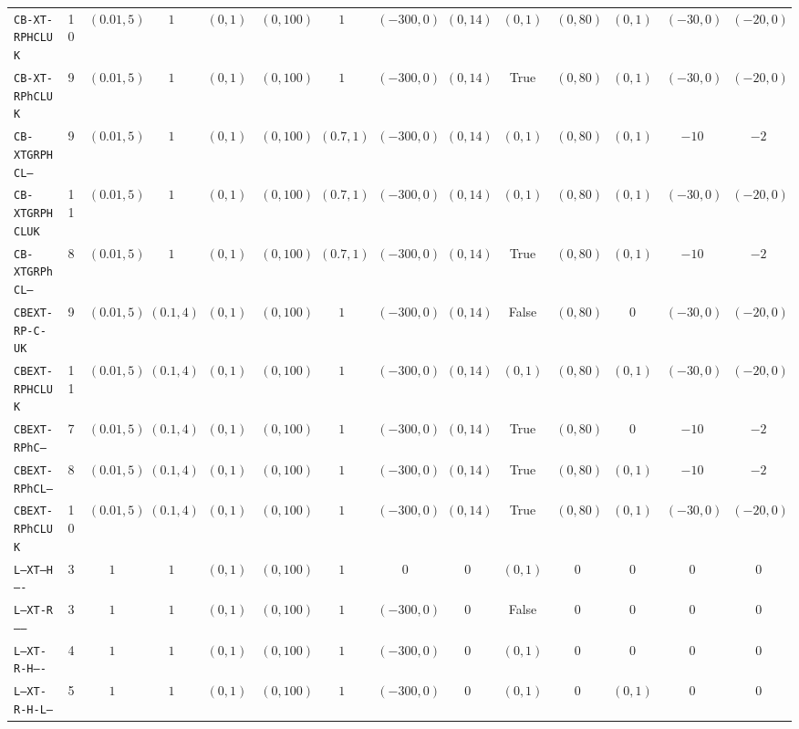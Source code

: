 {\begin{tabular}{l c c c c c c c c c c c c c }
\texttt{CB-XT-RPHCLUK} & 10 & $(0.01, 5)$ & $1$ & $(0, 1)$ & $(0, 100)$ & $1$ & $(-300, 0)$ & $(0, 14)$ & $(0, 1)$ & $(0, 80)$ & $(0, 1)$ & $(-30, 0)$ & $(-20, 0)$ \\
\texttt{CB-XT-RPhCLUK} & 9 & $(0.01, 5)$ & $1$ & $(0, 1)$ & $(0, 100)$ & $1$ & $(-300, 0)$ & $(0, 14)$ & \textrm{True} & $(0, 80)$ & $(0, 1)$ & $(-30, 0)$ & $(-20, 0)$ \\
\texttt{CB-XTGRPHCL--} & 9 & $(0.01, 5)$ & $1$ & $(0, 1)$ & $(0, 100)$ & $(0.7, 1)$ & $(-300, 0)$ & $(0, 14)$ & $(0, 1)$ & $(0, 80)$ & $(0, 1)$ & $-10$ & $-2$ \\
\texttt{CB-XTGRPHCLUK} & 11 & $(0.01, 5)$ & $1$ & $(0, 1)$ & $(0, 100)$ & $(0.7, 1)$ & $(-300, 0)$ & $(0, 14)$ & $(0, 1)$ & $(0, 80)$ & $(0, 1)$ & $(-30, 0)$ & $(-20, 0)$ \\
\texttt{CB-XTGRPhCL--} & 8 & $(0.01, 5)$ & $1$ & $(0, 1)$ & $(0, 100)$ & $(0.7, 1)$ & $(-300, 0)$ & $(0, 14)$ & \textrm{True} & $(0, 80)$ & $(0, 1)$ & $-10$ & $-2$ \\
\texttt{CBEXT-RP-C-UK} & 9 & $(0.01, 5)$ & $(0.1, 4)$ & $(0, 1)$ & $(0, 100)$ & $1$ & $(-300, 0)$ & $(0, 14)$ & \textrm{False} & $(0, 80)$ & $0$ & $(-30, 0)$ & $(-20, 0)$ \\
\texttt{CBEXT-RPHCLUK} & 11 & $(0.01, 5)$ & $(0.1, 4)$ & $(0, 1)$ & $(0, 100)$ & $1$ & $(-300, 0)$ & $(0, 14)$ & $(0, 1)$ & $(0, 80)$ & $(0, 1)$ & $(-30, 0)$ & $(-20, 0)$ \\
\texttt{CBEXT-RPhC---} & 7 & $(0.01, 5)$ & $(0.1, 4)$ & $(0, 1)$ & $(0, 100)$ & $1$ & $(-300, 0)$ & $(0, 14)$ & \textrm{True} & $(0, 80)$ & $0$ & $-10$ & $-2$ \\
\texttt{CBEXT-RPhCL--} & 8 & $(0.01, 5)$ & $(0.1, 4)$ & $(0, 1)$ & $(0, 100)$ & $1$ & $(-300, 0)$ & $(0, 14)$ & \textrm{True} & $(0, 80)$ & $(0, 1)$ & $-10$ & $-2$ \\
\texttt{CBEXT-RPhCLUK} & 10 & $(0.01, 5)$ & $(0.1, 4)$ & $(0, 1)$ & $(0, 100)$ & $1$ & $(-300, 0)$ & $(0, 14)$ & \textrm{True} & $(0, 80)$ & $(0, 1)$ & $(-30, 0)$ & $(-20, 0)$ \\
\texttt{L--XT---H----} & 3 & $1$ & $1$ & $(0, 1)$ & $(0, 100)$ & $1$ & $0$ & $0$ & $(0, 1)$ & $0$ & $0$ & $0$ & $0$ \\
\texttt{L--XT-R------} & 3 & $1$ & $1$ & $(0, 1)$ & $(0, 100)$ & $1$ & $(-300, 0)$ & $0$ & \textrm{False} & $0$ & $0$ & $0$ & $0$ \\
\texttt{L--XT-R-H----} & 4 & $1$ & $1$ & $(0, 1)$ & $(0, 100)$ & $1$ & $(-300, 0)$ & $0$ & $(0, 1)$ & $0$ & $0$ & $0$ & $0$ \\
\texttt{L--XT-R-H-L--} & 5 & $1$ & $1$ & $(0, 1)$ & $(0, 100)$ & $1$ & $(-300, 0)$ & $0$ & $(0, 1)$ & $0$ & $(0, 1)$ & $0$ & $0$ \\

\end{tabular}}
